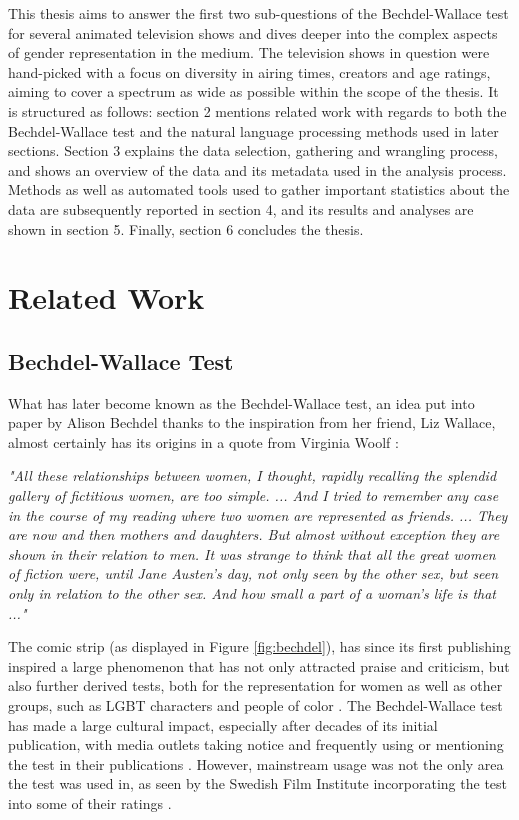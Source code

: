 \documentclass[a4paper, 11pt]{article}
\begin{document}
This thesis aims to answer the first two sub-questions of the Bechdel-Wallace test for several animated television shows and dives deeper into the complex aspects of gender representation in the medium. The television shows in question were hand-picked with a focus on diversity in airing times, creators and age ratings, aiming to cover a spectrum as wide as possible within the scope of the thesis. It is structured as follows: section 2 mentions related work with regards to both the Bechdel-Wallace test and the natural language processing methods used in later sections. Section 3 explains the data selection, gathering and wrangling process, and shows an overview of the data and its metadata used in the analysis process. Methods as well as automated tools used to gather important statistics about the data are subsequently reported in section 4, and its results and analyses are shown in section 5. Finally, section 6 concludes the thesis.

\section{Related Work}

\subsection{Bechdel-Wallace Test}
What has later become known as the Bechdel-Wallace test, an idea put into paper by Alison Bechdel thanks to the inspiration from her friend, Liz Wallace, almost certainly has its origins in a quote from Virginia Woolf \citep{testy}:

\begin{center}
\textit{"All these relationships between women, I thought, rapidly recalling the splendid gallery of fictitious women, are too simple. ... And I tried to remember any case in the course of my reading where two women are represented as friends. ... They are now and then mothers and daughters. But almost without exception they are shown in their relation to men. It was strange to think that all the great women of fiction were, until Jane Austen's day, not only seen by the other sex, but seen only in relation to the other sex. And how small a part of a woman's life is that ..."} \citep{woolf}
\end{center}

The comic strip (as displayed in Figure \ref{fig:bechdel}), has since its first publishing inspired a large phenomenon that has not only attracted praise and criticism, but also further derived tests, both for the representation for women as well as other groups, such as LGBT characters \citep{glaad} and people of color \citep{zeisler}. The Bechdel-Wallace test has made a large cultural impact, especially after decades of its initial publication, with media outlets taking notice and frequently using or mentioning the test in their publications \citep{pacificrim}. However, mainstream usage was not the only area the test was used in, as seen by the Swedish Film Institute incorporating the test into some of their ratings \citep{swedes}.
\end{document}
